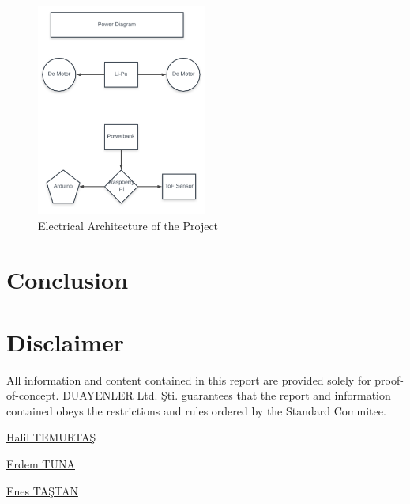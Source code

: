 \documentclass[a4paper,12pt]{article}
\begin{document}
	\begin{figure}[H]
		\includegraphics[width=0.5\textwidth,center]{images/elec_arch}
		\caption{Electrical Architecture of the Project}\label{fig:elec}
	\end{figure}
		
		\newpage
	
	\section{Conclusion}
	
	\newpage
		\section{Disclaimer}
		\vspace{1cm}
		
		\textsf{ All information and content contained in this report are provided solely for proof-of-concept. DUAYENLER Ltd. Şti. guarantees that the report and information contained obeys the restrictions and rules ordered by the Standard Commitee.}
		
		\vspace{1cm}
		
		
		\begin{minipage}[b]{0.33\linewidth}
			\centering
			\underline{Halil TEMURTAŞ}
		\end{minipage}%
		\begin{minipage}[b]{0.33\linewidth}
			\centering
			\underline{Erdem TUNA}
		\end{minipage}%
		\begin{minipage}[b]{0.33\linewidth}
			\centering
			\underline{Enes TAŞTAN}
		\end{minipage} \\[2.5cm]
		
\end{document}
